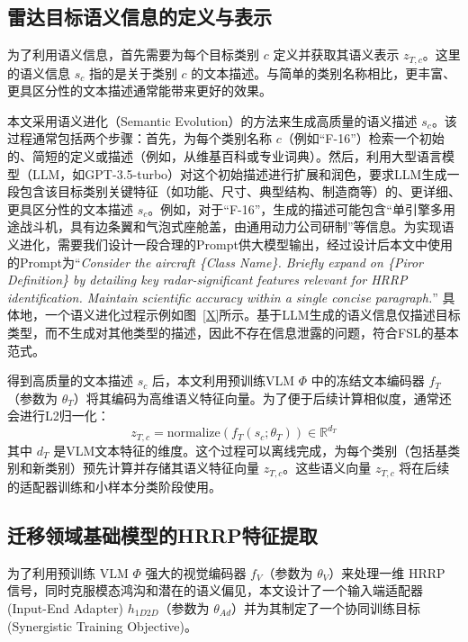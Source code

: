 \subsection{雷达目标语义信息的定义与表示}
\label{subsec:semantic_representation}

为了利用语义信息，首先需要为每个目标类别 $c$ 定义并获取其语义表示 $z_{T,c}$。这里的语义信息 $s_c$ 指的是关于类别 $c$ 的文本描述。与简单的类别名称相比，更丰富、更具区分性的文本描述通常能带来更好的效果。

本文采用语义进化（Semantic Evolution）的方法来生成高质量的语义描述 $s_c$。该过程通常包括两个步骤：首先，为每个类别名称 $c$（例如“F-16”）检索一个初始的、简短的定义或描述（例如，从维基百科或专业词典）。然后，利用大型语言模型（LLM，如GPT-3.5-turbo）对这个初始描述进行扩展和润色，要求LLM生成一段包含该目标类别关键特征（如功能、尺寸、典型结构、制造商等）的、更详细、更具区分性的文本描述 $s_c$。例如，对于“F-16”，生成的描述可能包含“单引擎多用途战斗机，具有边条翼和气泡式座舱盖，由通用动力公司研制”等信息。为实现语义进化，需要我们设计一段合理的Prompt供大模型输出，经过设计后本文中使用的Prompt为“\textit{Consider the aircraft \{Class Name\}. Briefly expand on \{Piror Definition\} by detailing key radar-significant features relevant for HRRP identification. Maintain scientific accuracy within a single concise paragraph.}” 具体地，一个语义进化过程示例如图~\ref{X}所示。基于LLM生成的语义信息仅描述目标类型，而不生成对其他类型的描述，因此不存在信息泄露的问题，符合FSL的基本范式。

得到高质量的文本描述 $s_c$ 后，本文利用预训练VLM $\Phi$ 中的冻结文本编码器 $f_T$（参数为 $\theta_T$）将其编码为高维语义特征向量。为了便于后续计算相似度，通常还会进行L2归一化：
\begin{equation}
    z_{T,c} = \text{normalize}(f_T(s_c; \theta_T)) \in \mathbb{R}^{d_T}
    \label{eq:semantic_encoding}
\end{equation}
其中 $d_T$ 是VLM文本特征的维度。这个过程可以离线完成，为每个类别（包括基类别和新类别）预先计算并存储其语义特征向量 $z_{T,c}$。这些语义向量 $z_{T,c}$ 将在后续的适配器训练和小样本分类阶段使用。

\subsection{迁移领域基础模型的HRRP特征提取}
\label{subsec:hrrp_feature_vlm}

为了利用预训练 VLM $\Phi$ 强大的视觉编码器 $f_V$（参数为 $\theta_V$）来处理一维 HRRP 信号，同时克服模态鸿沟和潜在的语义偏见，本文设计了一个输入端适配器 (Input-End Adapter) $h_{1D2D}$（参数为 $\theta_{Ad}$）并为其制定了一个协同训练目标 (Synergistic Training Objective)。 

